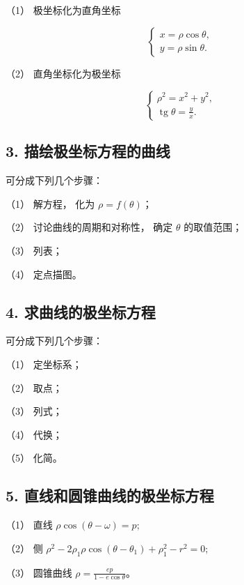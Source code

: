 （1） 极坐标化为直角坐标

\[
\left\{ \begin{array}{l} x = \rho \cos \theta, \\ y = \rho \sin \theta. \end{array} \right.
\]

（2） 直角坐标化为极坐标

\[
\left\{ \begin{array}{l} \rho^{2} = x^{2} + y^{2}, \\ \operatorname{tg} \theta = \frac {y}{x}. \end{array} \right.
\]

\subsection{3.
描绘极坐标方程的曲线}\label{ux63cfux7ed8ux6781ux5750ux6807ux65b9ux7a0bux7684ux66f2ux7ebf-1}

可分成下列几个步骤：

（1） 解方程， 化为 \(\rho = f(\theta)\)；

（2） 讨论曲线的周期和对称性， 确定 \(\theta\) 的取值范围；

（3） 列表；

（4） 定点描图。

\subsection{4.
求曲线的极坐标方程}\label{ux6c42ux66f2ux7ebfux7684ux6781ux5750ux6807ux65b9ux7a0b-1}

可分成下列几个步骤：

（1） 定坐标系；

（2） 取点；

（3） 列式；

（4） 代换；

（5） 化简。

\subsection{5.
直线和圆锥曲线的极坐标方程}\label{ux76f4ux7ebfux548cux5706ux9525ux66f2ux7ebfux7684ux6781ux5750ux6807ux65b9ux7a0b-1}

（1） 直线 \(\rho\cos(\theta-\omega)=p;\)

（2） 侧
\(\rho^2 - 2\rho_1\rho \cos (\theta - \theta_1) + \rho_1^2 - r^2 = 0;\)

（3） 圆锥曲线 \(\rho=\frac{ep}{1-e\cos\theta}\)。

